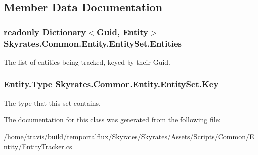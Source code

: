 \subsection{Member Data Documentation}
\hypertarget{class_skyrates_1_1_common_1_1_entity_1_1_entity_set_a10abd171b6f9160186b98922e8a8bbd7}{
\subsubsection[{Entities}]{\setlength{\rightskip}{0pt plus 5cm}readonly Dictionary$<$Guid, {\bf Entity}$>$ Skyrates.\-Common.\-Entity.\-Entity\-Set.\-Entities}}\label{class_skyrates_1_1_common_1_1_entity_1_1_entity_set_a10abd171b6f9160186b98922e8a8bbd7}


The list of entities being tracked, keyed by their Guid. 

\hypertarget{class_skyrates_1_1_common_1_1_entity_1_1_entity_set_a3088854c457442307d007b6d95a6f6c3}{
\subsubsection[{Key}]{\setlength{\rightskip}{0pt plus 5cm}Entity.\-Type Skyrates.\-Common.\-Entity.\-Entity\-Set.\-Key}}\label{class_skyrates_1_1_common_1_1_entity_1_1_entity_set_a3088854c457442307d007b6d95a6f6c3}


The type that this set contains. 



The documentation for this class was generated from the following file\-:\begin{DoxyCompactItemize}
\item 
/home/travis/build/temportalflux/\-Skyrates/\-Skyrates/\-Assets/\-Scripts/\-Common/\-Entity/Entity\-Tracker.\-cs\end{DoxyCompactItemize}
